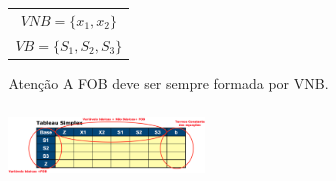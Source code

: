 \begin{frame}
\begin{columns}
\begin{column}{0.3\textwidth}
\begin{table}
{				}						
			\end{table}
		\end{column}
		\centering
		\begin{column}{0.4\textwidth}
			\centering
			\only<5>
			{
				\begin{tabular}{c}
					\hline
					$
						VNB = \{ x_1, x_2 \} 
					$ \\
					$
						VB = \{ S_1, S_2, S_3 \} 
					$ \\
					\hline
				\end{tabular}
				\begin{alertblock}{Atenção}
					A FOB deve ser sempre formada por VNB.
				\end{alertblock}
				
			}		
			{
				\includegraphics[width=5.2cm,height=2cm]{tableau.png}	
			}		
		\end{column}
	\end{columns}
\end{frame}

